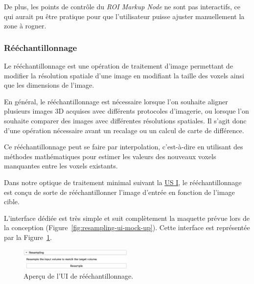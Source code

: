 \documentclass{article}
\begin{document}
{{{{                De plus, les points de contrôle du \textit{ROI Markup Node} ne sont pas interactifs, ce qui aurait pu être pratique pour que l'utilisateur puisse ajuster manuellement la zone à rogner.
            }
        }

        {
            \subsubsection{Rééchantillonnage}
            \label{subsubsec:resampling-preprocessing-implementation}

            Le rééchantillonnage est une opération de traitement d'image permettant de modifier la résolution spatiale d'une image en modifiant la taille des voxels ainsi que les dimensions de l'image.

            En général, le rééchantillonnage est nécessaire lorsque l'on souhaite aligner plusieurs images 3D acquises avec différents protocoles d'imagerie, ou lorsque l'on souhaite comparer des images avec différentes résolutions spatiales. Il s'agit donc d'une opération nécessaire avant un recalage ou un calcul de carte de différence.

            Ce rééchantillonnage peut se faire par interpolation, c'est-à-dire en utilisant des méthodes mathématiques pour estimer les valeurs des nouveaux voxels manquantes entre les voxels existants.

            \bigskip

            Dans notre optique de traitement minimal suivant la \hyperref[us:preprocessing]{US I}, le rééchantillonnage est conçu de sorte de rééchantillonner l'image d'entrée en fonction de l'image cible.

            L'interface dédiée est très simple et suit complètement la maquette prévue lors de la conception (Figure~\ref{fig:resampling-ui-mock-up}). Cette interface est représentée par la Figure~\ref{fig:resampling-ui}.

            \begin{figure}[!ht]
                \centering
                \includegraphics[width=0.5\textwidth]{images/resampling-ui.png}
                \caption{Aperçu de l'UI de rééchantillonnage.}
                \label{fig:resampling-ui}
            \end{figure}

}}}
\end{document}
